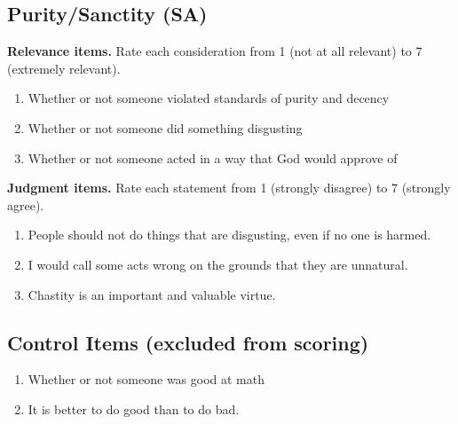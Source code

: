 \documentclass[11pt]{article}
\begin{document}
\subsection*{Purity/Sanctity (SA)}
\textbf{Relevance items.} Rate each consideration from 1 (not at all relevant) to 7 (extremely relevant).
\begin{enumerate}
\item[SA25] Whether or not someone violated standards of purity and decency
\item[SA26] Whether or not someone did something disgusting
\item[SA27] Whether or not someone acted in a way that God would approve of
\end{enumerate}
\textbf{Judgment items.} Rate each statement from 1 (strongly disagree) to 7 (strongly agree).
\begin{enumerate}
\item[SA28] People should not do things that are disgusting, even if no one is harmed.
\item[SA29] I would call some acts wrong on the grounds that they are unnatural.
\item[SA30] Chastity is an important and valuable virtue.
\end{enumerate}
\subsection*{Control Items (excluded from scoring)}
\begin{enumerate}
\item[CT31] Whether or not someone was good at math
\item[CT32] It is better to do good than to do bad.
\end{enumerate}
\end{document}

